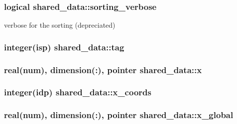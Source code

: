 \subsubsection[{\texorpdfstring{sorting\+\_\+verbose}{sorting_verbose}}]{\setlength{\rightskip}{0pt plus 5cm}logical shared\+\_\+data\+::sorting\+\_\+verbose}\hypertarget{namespaceshared__data_a1e3cea0f116b338483676d0bd5126c75}{}\label{namespaceshared__data_a1e3cea0f116b338483676d0bd5126c75}


verbose for the sorting (depreciated) 

\subsubsection[{\texorpdfstring{tag}{tag}}]{\setlength{\rightskip}{0pt plus 5cm}integer(isp) shared\+\_\+data\+::tag}\hypertarget{namespaceshared__data_a7877a929286571631efc41c30444e7cd}{}\label{namespaceshared__data_a7877a929286571631efc41c30444e7cd}
\subsubsection[{\texorpdfstring{x}{x}}]{\setlength{\rightskip}{0pt plus 5cm}real(num), dimension(\+:), pointer shared\+\_\+data\+::x}\hypertarget{namespaceshared__data_a5a1b9ce71c6bcfbe478783cc7a5e4d7d}{}\label{namespaceshared__data_a5a1b9ce71c6bcfbe478783cc7a5e4d7d}
\subsubsection[{\texorpdfstring{x\+\_\+coords}{x_coords}}]{\setlength{\rightskip}{0pt plus 5cm}integer(idp) shared\+\_\+data\+::x\+\_\+coords}\hypertarget{namespaceshared__data_ad2930b2e73ee090643c12e9cb17176ec}{}\label{namespaceshared__data_ad2930b2e73ee090643c12e9cb17176ec}
\subsubsection[{\texorpdfstring{x\+\_\+global}{x_global}}]{\setlength{\rightskip}{0pt plus 5cm}real(num), dimension(\+:), pointer shared\+\_\+data\+::x\+\_\+global}\hypertarget{namespaceshared__data_a103bc2f0564094768f3a34476b371d3a}{}\label{namespaceshared__data_a103bc2f0564094768f3a34476b371d3a}

